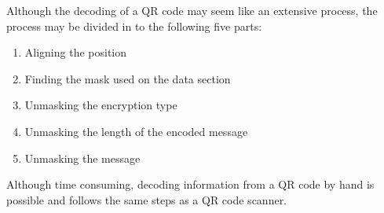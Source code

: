 Although the decoding of a QR code may seem like an extensive process, the process may be divided in to the following five parts:

\begin{enumerate}
	\item Aligning the position
	\item Finding the mask used on the data section
	\item Unmasking the encryption type
	\item Unmasking the length of the encoded message
	\item Unmasking the message
\end{enumerate}

Although time consuming, decoding information from a QR code by hand is possible and follows the same steps as a QR code scanner.
